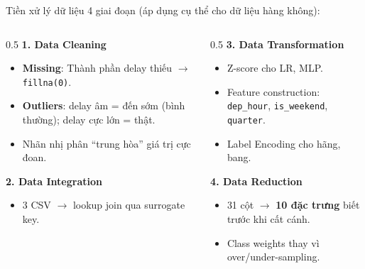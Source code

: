 \begin{frame}{Tiền xử lý dữ liệu}
4 giai đoạn (áp dụng cụ thể cho dữ liệu hàng không):

\vspace{2mm}
\begin{columns}[T,onlytextwidth]
\begin{column}{0.5\textwidth}
\textbf{1. Data Cleaning}
\begin{itemize}
  \item \textbf{Missing}: Thành phần delay thiếu $\to$ \texttt{fillna(0)}.
  \item \textbf{Outliers}: delay âm = đến sớm (bình thường); delay cực lớn = thật.
  \item Nhãn nhị phân ``trung hòa'' giá trị cực đoan.
\end{itemize}

\vspace{1mm}
\textbf{2. Data Integration}
\begin{itemize}
  \item 3 CSV $\to$ lookup join qua surrogate key.
\end{itemize}
\end{column}
\begin{column}{0.5\textwidth}
\textbf{3. Data Transformation}
\begin{itemize}
  \item Z-score cho LR, MLP.
  \item Feature construction: \texttt{dep\_hour}, \texttt{is\_weekend}, \texttt{quarter}.
  \item Label Encoding cho hãng, bang.
\end{itemize}

\vspace{1mm}
\textbf{4. Data Reduction}
\begin{itemize}
  \item 31 cột $\to$ \textbf{10 đặc trưng} biết trước khi cất cánh.
  \item Class weights thay vì over/under-sampling.
\end{itemize}
\end{column}
\end{columns}
\end{frame}

